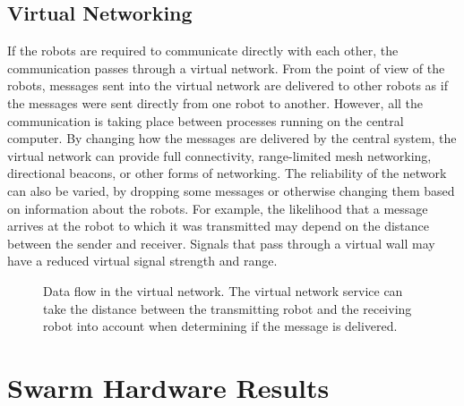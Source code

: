 \subsection{Virtual Networking} \label{section:Virtual_Networking}

If the robots are required to communicate directly with each other, the communication passes through a virtual network.
From the point of view of the robots, messages sent into the virtual network are delivered to other robots as if the messages were sent directly from one robot to another. 
However, all the communication is taking place between processes running on the central computer.
By changing how the messages are delivered by the central system, the virtual network can provide full connectivity, range-limited mesh networking, directional beacons, or other forms of networking. 
The reliability of the network can also be varied, by dropping some messages or otherwise changing them based on information about the robots. 
For example, the likelihood that a message arrives at the robot to which it was transmitted may depend on the distance between the sender and receiver.
Signals that pass through a virtual wall may have a reduced virtual signal strength and range.

 \begin{figure}
 	\centering
	\caption{Data flow in the virtual network. The virtual network service can take the distance between the transmitting robot and the receiving robot into account when determining if the message is delivered.}
 \end{figure}

\section{Swarm Hardware Results} \label{section:The_Desert_of_the_Real}

